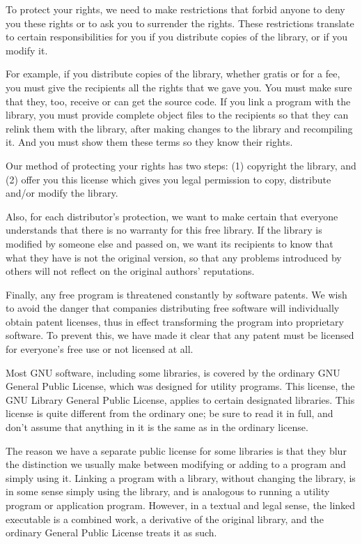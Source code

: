 To protect your rights, we need to make restrictions that forbid
anyone to deny you these rights or to ask you to surrender the rights.
These restrictions translate to certain responsibilities for you if
you distribute copies of the library, or if you modify it.

For example, if you distribute copies of the library, whether gratis
or for a fee, you must give the recipients all the rights that we gave
you. You must make sure that they, too, receive or can get the source
code. If you link a program with the library, you must provide
complete object files to the recipients so that they can relink them
with the library, after making changes to the library and recompiling
it. And you must show them these terms so they know their rights.

Our method of protecting your rights has two steps: (1) copyright
the library, and (2) offer you this license which gives you legal
permission to copy, distribute and/or modify the library.

Also, for each distributor's protection, we want to make certain
that everyone understands that there is no warranty for this free
library. If the library is modified by someone else and passed on, we
want its recipients to know that what they have is not the original
version, so that any problems introduced by others will not reflect on
the original authors' reputations.

Finally, any free program is threatened constantly by software
patents. We wish to avoid the danger that companies distributing free
software will individually obtain patent licenses, thus in effect
transforming the program into proprietary software. To prevent this,
we have made it clear that any patent must be licensed for everyone's
free use or not licensed at all.

Most GNU software, including some libraries, is covered by the ordinary
GNU General Public License, which was designed for utility programs. This
license, the GNU Library General Public License, applies to certain
designated libraries. This license is quite different from the ordinary
one; be sure to read it in full, and don't assume that anything in it is
the same as in the ordinary license.

The reason we have a separate public license for some libraries is that
they blur the distinction we usually make between modifying or adding to a
program and simply using it. Linking a program with a library, without
changing the library, is in some sense simply using the library, and is
analogous to running a utility program or application program. However, in
a textual and legal sense, the linked executable is a combined work, a
derivative of the original library, and the ordinary General Public License
treats it as such.

